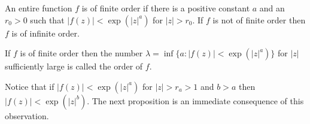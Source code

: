 An entire function $f$ is of finite order if there is a positive constant $a$ and an $r_0 > 0$ such that $|f(z)| < \exp (|z|^a)$ for $|z| > r_0$. If $f$ is not of finite order then $f$ is of infinite order.

If $f$ is of finite order then the number $\lambda = \inf \{a : |f(z)| < \exp (|z|^a)\}$ for $|z|$ sufficiently large is called the order of $f$.

Notice that if $|f(z)| < \exp (|z|^a)$ for $|z| > r_a > 1$ and $b > a$ then $|f(z)| < \exp (|z|^b)$. The next proposition is an immediate consequence of this observation.
